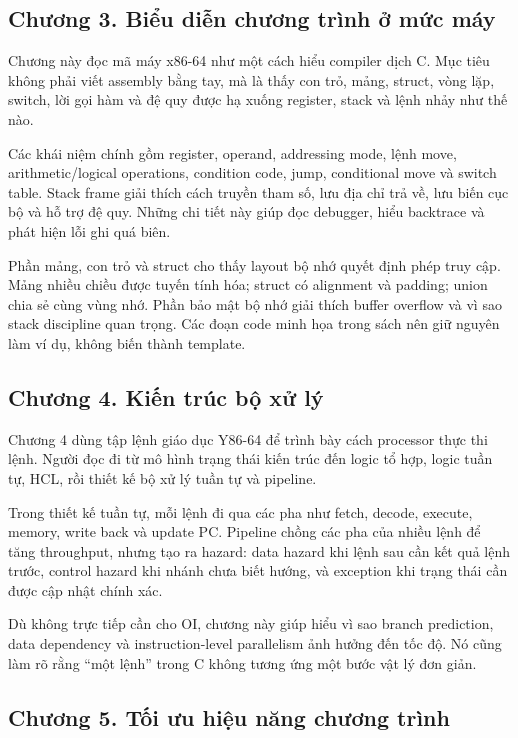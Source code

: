 \documentclass[11pt]{article}
\begin{document}
\subsection*{Chương 3. Biểu diễn chương trình ở mức máy}

Chương này đọc mã máy x86-64 như một cách hiểu compiler dịch C. Mục tiêu
không phải viết assembly bằng tay, mà là thấy con trỏ, mảng, struct, vòng lặp,
switch, lời gọi hàm và đệ quy được hạ xuống register, stack và lệnh nhảy như
thế nào.

Các khái niệm chính gồm register, operand, addressing mode, lệnh move, arithmetic/logical operations, condition code, jump, conditional move và switch
table. Stack frame giải thích cách truyền tham số, lưu địa chỉ trả về, lưu biến
cục bộ và hỗ trợ đệ quy. Những chi tiết này giúp đọc debugger, hiểu backtrace
và phát hiện lỗi ghi quá biên.

Phần mảng, con trỏ và struct cho thấy layout bộ nhớ quyết định phép truy cập.
Mảng nhiều chiều được tuyến tính hóa; struct có alignment và padding; union
chia sẻ cùng vùng nhớ. Phần bảo mật bộ nhớ giải thích buffer overflow và vì sao
stack discipline quan trọng. Các đoạn code minh họa trong sách nên giữ nguyên
làm ví dụ, không biến thành template.

\subsection*{Chương 4. Kiến trúc bộ xử lý}

Chương 4 dùng tập lệnh giáo dục Y86-64 để trình bày cách processor thực thi
lệnh. Người đọc đi từ mô hình trạng thái kiến trúc đến logic tổ hợp, logic tuần
tự, HCL, rồi thiết kế bộ xử lý tuần tự và pipeline.

Trong thiết kế tuần tự, mỗi lệnh đi qua các pha như fetch, decode, execute,
memory, write back và update PC. Pipeline chồng các pha của nhiều lệnh để tăng
throughput, nhưng tạo ra hazard: data hazard khi lệnh sau cần kết quả lệnh
trước, control hazard khi nhánh chưa biết hướng, và exception khi trạng thái cần
được cập nhật chính xác.

Dù không trực tiếp cần cho OI, chương này giúp hiểu vì sao branch prediction,
data dependency và instruction-level parallelism ảnh hưởng đến tốc độ. Nó cũng
làm rõ rằng ``một lệnh'' trong C không tương ứng một bước vật lý đơn giản.

\subsection*{Chương 5. Tối ưu hiệu năng chương trình}
\end{document}
